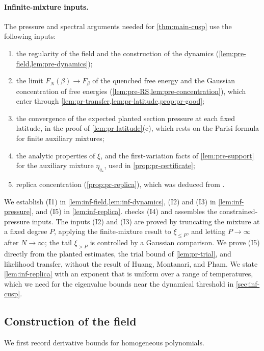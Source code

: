 \paragraph{Infinite-mixture inputs.} The pressure and spectral arguments needed for \cref{thm:main-cusp} use the following inputs:
\begin{enumerate}
\item[(I1)] the regularity of the field and the construction of the dynamics (\cref{lem:pre-field,lem:pre-dynamics});
\item[(I2)] the limit $F_N(\beta)\to F_\beta$ of the quenched free energy and the Gaussian concentration of free energies (\cref{lem:pre-RS,lem:pre-concentration}), which enter through \cref{lem:pr-transfer,lem:pr-latitude,prop:pr-good};
\item[(I3)] the convergence of the expected planted section pressure at each fixed latitude, in the proof of \cref{lem:pr-latitude}(c), which rests on the Parisi formula for finite auxiliary mixtures;
\item[(I4)] the analytic properties of $\xi$, and the first-variation facts of \cref{lem:pre-support} for the auxiliary mixture $\eta_{q_*}$, used in \cref{prop:pr-certificate};
\item[(I5)] replica concentration (\cref{prop:pr-replica}), which was deduced from \citet[Lemma~7.7]{HuangMontanariPham2024}.
\end{enumerate}
We establish (I1) in \cref{lem:inf-field,lem:inf-dynamics}, (I2) and (I3) in \cref{lem:inf-pressure}, and (I5) in \cref{lem:inf-replica}.  checks (I4) and assembles the constrained-pressure inputs. The inputs (I2) and (I3) are proved by truncating the mixture at a fixed degree $P$, applying the finite-mixture result to $\xi_{\le P}$, and letting $P\to\infty$ after $N\to\infty$; the tail $\xi_{>P}$ is controlled by a Gaussian comparison. We prove (I5) directly from the planted estimates, the trial bound of \cref{lem:pr-trial}, and likelihood transfer, without the result of Huang, Montanari, and Pham. We state \cref{lem:inf-replica} with an exponent that is uniform over a range of temperatures, which we need for the eigenvalue bounds near the dynamical threshold in \cref{sec:inf-cusp}.

\subsection{Construction of the field}\label{sec:inf-field}

We first record derivative bounds for homogeneous polynomials.

